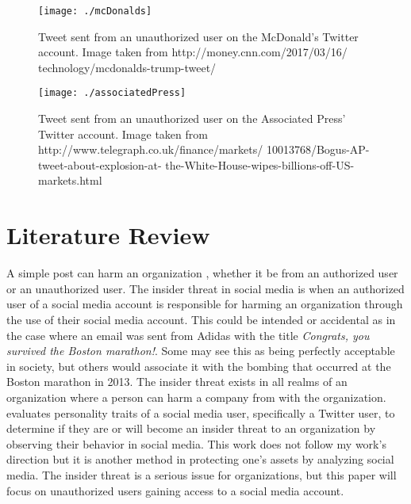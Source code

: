 \documentclass[11pt]{article}
\begin{document}

\begin{figure}
  \texttt{[image: ./mcDonalds]}
  \caption{Tweet sent from an unauthorized user on the McDonald's Twitter account. Image taken from http://money.cnn.com/2017/03/16/ technology/mcdonalds-trump-tweet/}
  \label{mcDonalds}
\end{figure}

\begin{figure}
  \texttt{[image: ./associatedPress]}
  \caption{Tweet sent from an unauthorized user on the Associated Press' Twitter account. Image taken from http://www.telegraph.co.uk/finance/markets/ 10013768/Bogus-AP-tweet-about-explosion-at-
the-White-House-wipes-billions-off-US-markets.html}
  \label{press}
\end{figure}

\section{Literature Review} \label{litReview}
A simple post can harm an organization \cite{oehri2012social}, whether it be from an authorized user or an unauthorized user. The insider threat in social media is when an authorized user of a social media account is responsible for harming an organization through the use of their social media account. This could be intended or accidental as in the case where an email was sent from Adidas with the title \textit{Congrats, you survived the Boston marathon!}. Some may see this as being perfectly acceptable in society, but others would associate it with the bombing that occurred at the Boston marathon in 2013. The insider threat exists in all realms of an organization where a person can harm a company from with the organization. \cite{gritzalis} evaluates personality traits of a social media user, specifically a Twitter user, to determine if they are or will become an insider threat to an organization by observing their behavior in social media. This work does not follow my work's direction but it is another method in protecting one's assets by analyzing social media. The insider threat is a serious issue for organizations, but this paper will focus on unauthorized users gaining access to a social media account.
\end{document}
